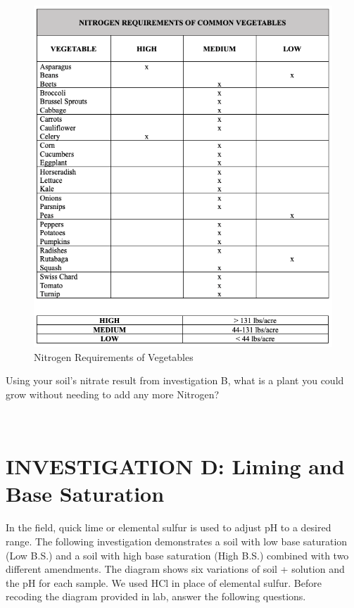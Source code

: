 \documentclass[
  letterpaper,
  twocolumn,
  portrait]{scrbook}
\begin{document}
\begin{figure}

{\centering \includegraphics{nitrogen-requirements-veg.png}

}

\caption{\label{fig-nitrogen}Nitrogen Requirements of Vegetables}

\end{figure}

Using your soil's nitrate result from investigation B, what is a plant
you could grow without needing to add any more Nitrogen?

~ ~ ~

\hypertarget{investigation-d-liming-and-base-saturation}{%
\section{INVESTIGATION D: Liming and Base
Saturation}\label{investigation-d-liming-and-base-saturation}}

In the field, quick lime or elemental sulfur is used to adjust pH to a
desired range. The following investigation demonstrates a soil with low
base saturation (Low B.S.) and a soil with high base saturation (High
B.S.) combined with two different amendments. The diagram shows six
variations of soil + solution and the pH for each sample. We used HCl in
place of elemental sulfur. Before recoding the diagram provided in lab,
answer the following questions.
\end{document}
